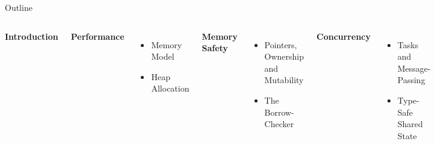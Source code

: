 \documentclass[xcolor=dvipsnames]{beamer}
\begin{document}
\begin{frame}{Outline}
	\begin{columns}
	\textbf{Introduction}
	\linegap

	{\bf Performance}
	\begin{itemize}
		\item Memory Model %
		\item Heap Allocation %
	\end{itemize}
	\linegap

	{\bf Memory Safety}
	\begin{itemize}
		\item Pointers, Ownership and Mutability %
		\item The Borrow-Checker
	\end{itemize}
	\linegap

	{\bf Concurrency}
	\begin{itemize}
		\item Tasks and Message-Passing
		\item Type-Safe Shared State %
	\end{itemize}
	\linegap

	\begin{center}
	\includegraphics[width=0.9\textwidth]{rust.png}
	\end{center}
	\end{columns}
\end{frame}
\end{document}
